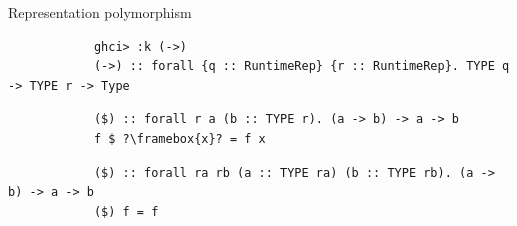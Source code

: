     \begin{frame}[fragile]{Representation polymorphism}
        \pause
        \begin{verbatim}
            ghci> :k (->)
            (->) :: forall {q :: RuntimeRep} {r :: RuntimeRep}. TYPE q -> TYPE r -> Type
        \end{verbatim}

        \pause\hspace{2em}
        \begin{verbatim}
            ($) :: forall r a (b :: TYPE r). (a -> b) -> a -> b
            f $ ?\framebox{x}? = f x
        \end{verbatim}

        \pause\hspace{2em}
        \begin{verbatim}
            ($) :: forall ra rb (a :: TYPE ra) (b :: TYPE rb). (a -> b) -> a -> b
            ($) f = f
        \end{verbatim}
    \end{frame}



